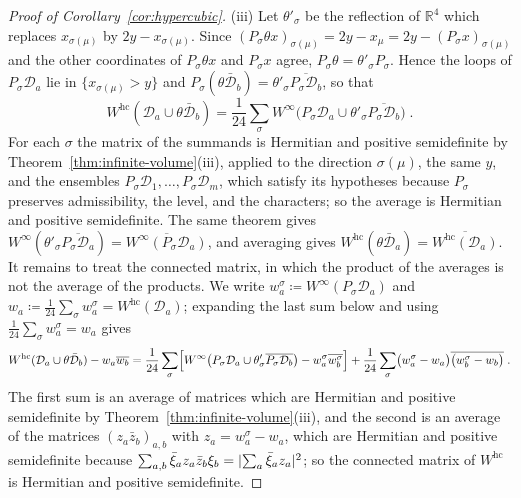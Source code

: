 \documentclass[11pt]{preprint}
\DeclarePairedDelimiter{\abs}{\lvert}{\rvert}
\numberwithin{equation}{section}
\theoremstyle{definition}
\theoremstyle{remark}
\theoremstyle{plain}
\begin{document}
\begin{proof}[Proof of Corollary~\ref{cor:hypercubic}]
(iii) Let $\theta'_\sigma$ be the reflection of $\mathbb R^4$ which replaces $x_{\sigma(\mu)}$ by $2y - x_{\sigma(\mu)}$. Since $(P_\sigma\theta x)_{\sigma(\mu)} = 2y - x_\mu = 2y - (P_\sigma x)_{\sigma(\mu)}$ and the other coordinates of $P_\sigma\theta x$ and $P_\sigma x$ agree, $P_\sigma\theta = \theta'_\sigma P_\sigma$. Hence the loops of $P_\sigma\mathcal D_a$ lie in $\{ x_{\sigma(\mu)} > y \}$ and $P_\sigma(\theta\bar{\mathcal D}_b) = \theta'_\sigma\overline{P_\sigma\mathcal D_b}$, so that
\begin{equation}\label{eq:averaged-gram}
    W^{\mathrm{hc}}(\mathcal D_a \cup \theta\bar{\mathcal D}_b) = \frac{1}{24}\sum_\sigma W^\infty\bigl(P_\sigma\mathcal D_a \cup \theta'_\sigma\overline{P_\sigma\mathcal D_b}\bigr)\;.
\end{equation}
For each $\sigma$ the matrix of the summands is Hermitian and positive semidefinite by Theorem~\ref{thm:infinite-volume}(iii), applied to the direction $\sigma(\mu)$, the same $y$, and the ensembles $P_\sigma\mathcal D_1, \dots, P_\sigma\mathcal D_m$, which satisfy its hypotheses because $P_\sigma$ preserves admissibility, the level, and the characters; so the average is Hermitian and positive semidefinite. The same theorem gives $W^\infty(\theta'_\sigma\overline{P_\sigma\mathcal D_a}) = \overline{W^\infty(P_\sigma\mathcal D_a)}$, and averaging gives $W^{\mathrm{hc}}(\theta\bar{\mathcal D}_a) = \overline{W^{\mathrm{hc}}(\mathcal D_a)}$. It remains to treat the connected matrix, in which the product of the averages is not the average of the products. We write $w^\sigma_a \coloneqq W^\infty(P_\sigma\mathcal D_a)$ and $w_a \coloneqq \frac{1}{24}\sum_\sigma w^\sigma_a = W^{\mathrm{hc}}(\mathcal D_a)$; expanding the last sum below and using $\frac{1}{24}\sum_\sigma w^\sigma_a = w_a$ gives
\begin{equation}\label{eq:averaged-connected}
    W^{\mathrm{hc}}(\mathcal D_a \cup \theta\bar{\mathcal D}_b) - w_a\overline{w_b} = \frac{1}{24}\sum_\sigma\Bigl[W^\infty\bigl(P_\sigma\mathcal D_a \cup \theta'_\sigma\overline{P_\sigma\mathcal D_b}\bigr) - w^\sigma_a\overline{w^\sigma_b}\Bigr] + \frac{1}{24}\sum_\sigma\bigl(w^\sigma_a - w_a\bigr)\overline{\bigl(w^\sigma_b - w_b\bigr)}\;.
\end{equation}
The first sum is an average of matrices which are Hermitian and positive semidefinite by Theorem~\ref{thm:infinite-volume}(iii), and the second is an average of the matrices $(z_a\bar z_b)_{a,b}$ with $z_a = w^\sigma_a - w_a$, which are Hermitian and positive semidefinite because $\sum_{a,b}\bar\xi_az_a\bar z_b\xi_b = \abs{\sum_a\bar\xi_az_a}^2$; so the connected matrix of $W^{\mathrm{hc}}$ is Hermitian and positive semidefinite.
\end{proof}
\end{document}
